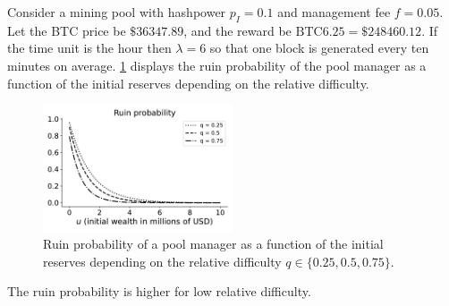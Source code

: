 \begin{ex}\label{ex:rp_pool_manager}
Consider a mining pool with hashpower $p_I = 0.1$ and management fee $f = 0.05$. Let the BTC price be $\$36347.89$, and the reward be $\text{BTC}6.25 = \$248460.12$. If the time unit is the hour then $\lambda = 6$ so that one block is generated every ten minutes on average. \cref{fig:rp_pool_manager} displays the ruin probability of the pool manager as a function of the initial reserves depending on the relative difficulty.
\begin{figure}[!ht]
  \begin{center}
      \includegraphics[width = 0.5\textwidth]{../Figures/rp_pool_manager}
    \caption{Ruin probability of a pool manager as a function of the initial reserves depending on the relative difficulty $q\in \{0.25, 0.5, 0.75\}$.}
    \label{fig:rp_pool_manager}
  \end{center}
\end{figure}
The ruin probability is higher for low relative difficulty.
\end{ex}
